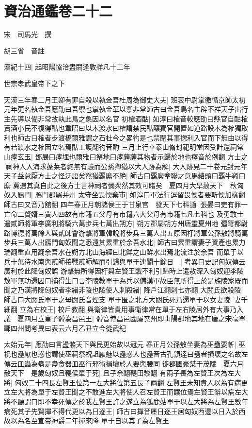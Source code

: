 \chapter{資治通鑑卷二十二}
宋　司馬光　撰

胡三省　音註

漢紀十四|{
	起昭陽恊洽盡閼逢敦牂凡十二年}


世宗孝武皇帝下之下

天漢三年春二月王卿有罪自殺以執金吾杜周為御史大夫|{
	班表中尉掌徼循京師太初元年更名執金吾應劭曰吾禦也掌執金革以禦非常師古曰金吾鳥名主辟不祥天子出行主先導以備非常故執此鳥之象因以名官}
初榷酒酤|{
	如淳曰榷音較應劭曰縣官自酤榷賣酒小民不復得酤也韋昭曰以木渡水曰榷謂禁民酤釀獨官開置如道路設木為榷獨取利也師古曰榷者步渡橋爾雅謂之石杜今之畧彴是也禁閉其事揔利入官而下無由以得有若渡水之榷因立名焉酤工護翻彴音酌}
三月上行幸泰山脩封祀明堂因受計還祠常山瘞玄玉|{
	鄧展曰瘞埋也爾雅曰祭地曰瘞薶薶其物者示歸於地也瘞音於例翻}
方士之祠神人入海求蓬莱者終無有驗而公孫卿猶以大人跡為解|{
	大人跡見二十卷元封元年}
天子益怠厭方士之怪迂語矣然猶覊縻不絶|{
	師古曰覊縻牽聯之意馬絡頭曰覊牛靷曰縻}
冀遇其真自此之後方士言神祠者彌衆然其效可睹矣　夏四月大旱赦天下　秋匈奴入鴈門|{
	鴈門郡屬并州}
太守坐畏愞棄市|{
	如淳曰軍法行逗留畏愞者要斬愞加椽翻師古曰又音乃舘翻}
四年春正月朝諸侯王于甘泉宫　發天下七科讁|{
	張晏曰吏有罪一亡命二贅婿三賈人四故有市籍五父母有市籍六大父母有市籍七凡七科也}
及勇敢士遣貳師將軍李廣利將騎六萬步兵七萬出朔方|{
	朔方郡屬朔方州唐靈夏州地}
彊弩都尉路博德將萬餘人與貳師會游擊將軍韓說將步兵三萬人出五原因杅將軍公孫敖將騎萬步兵三萬人出鴈門匈奴聞之悉遠其累重於余吾水北|{
	師古曰累重謂妻子資產也累力瑞翻重直用翻余吾水在朔方北山海經曰北鮮之山鮮水出焉北流注於余吾}
而單于以兵十萬待水南與貳師接戰貳師解而引歸與單于連闘十餘日　|{
	考異曰史記匈奴傳云廣利於此降匈奴誤}
游擊無所得因杅與左賢王戰不利引歸時上遣敖深入匈奴迎李陵敖軍無功還因曰捕得生口言李陵教單于為兵以備漢軍故臣無所得上於是族陵家既而聞之乃漢將降匈奴者李緒非陵也陵使人刺殺緒|{
	降戶江翻刺七亦翻}
大閼氏欲殺陵|{
	師古曰大閼氏單于之母閼氏音煙支}
單于匿之北方大閼氏死乃還單于以女妻陵|{
	妻千細翻}
立為右校王|{
	校戶教翻}
與衛律皆貴用事衛律常在單于左右陵居外有大事乃入議　夏四月立皇子髆為昌邑王|{
	髆音博昌邑國屬兖州即山陽郡地其地在唐之宋亳單鄆四州問考異曰表云六月乙丑立今從武紀}


太始元年|{
	應劭曰言盪滌天下與民更始故以冠元}
春正月公孫敖坐妻為巫蠱要斬|{
	巫祝也蠱厭也惑也謂使巫祠祭祝詛厭魅以蠱惑人也蠱音古孔頴逹曰蠱者損壞之名故左傳云皿蟲為蠱是蠱食器皿巫行邪術損壞於人要與腰同}
徙郡國豪桀于茂陵　夏六月赦天下　是歲匈奴且鞮侯單于死|{
	且子余翻鞮田黎翻}
有兩子長為左賢王次為左大將|{
	匈奴二十四長左賢王位第一左大將位第五長子兩翻}
左賢王未知貴人以為有病更立左大將為單于左賢王聞之不敢進左大將使人召左賢王而讓位焉左賢王辭以病左大將不聽謂曰即不幸死傳之於我左賢王許之遂立為狐鹿姑單于以左大將為左賢王數年病死其子先賢撣不得代更以為日逐王|{
	師古曰撣音㕓日逐王居匈奴西邊以日入於西故以為名至宣帝神爵二年撣來降}
單于自以其子為左賢王

